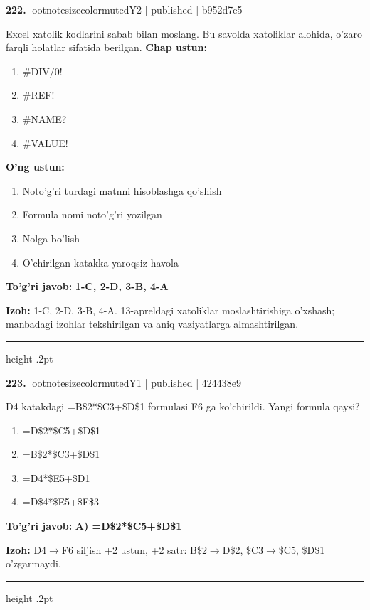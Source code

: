 \documentclass[10pt,a4paper]{article}
\begin{document}
\textbf{\color{ink}222.} {ootnotesizecolor{muted}Y2 | published | b952d7e5}
\par
Excel xatolik kodlarini sabab bilan moslang. Bu savolda xatoliklar alohida, o'zaro farqli holatlar sifatida berilgan.
\textbf{Chap ustun:}\begin{enumerate}[label=\arabic*),leftmargin=9mm]
\item \#DIV/0!
\item \#REF!
\item \#NAME?
\item \#VALUE!
\end{enumerate}
\textbf{O'ng ustun:}\begin{enumerate}[label=\Alph*),leftmargin=9mm]
\item Noto'g'ri turdagi matnni hisoblashga qo'shish
\item Formula nomi noto'g'ri yozilgan
\item Nolga bo'lish
\item O'chirilgan katakka yaroqsiz havola
\end{enumerate}
\begin{tcolorbox}[enhanced,breakable,colback=teal!4,colframe=teal!55!black,boxrule=0.45pt,arc=1.2mm,left=2.8mm,right=2.8mm,top=2mm,bottom=2mm]
\textbf{\color{teal}To'g'ri javob:} \textbf{1-C, 2-D, 3-B, 4-A}
\par\smallskip
\textbf{Izoh:} 1-C, 2-D, 3-B, 4-A. 13-apreldagi xatoliklar moslashtirishiga o'xshash; manbadagi izohlar tekshirilgan va aniq vaziyatlarga almashtirilgan.
\end{tcolorbox}
\vspace{2mm}\hrule height .2pt\vspace{2mm}

\textbf{\color{ink}223.} {ootnotesizecolor{muted}Y1 | published | 424438e9}
\par
D4 katakdagi =B\$2*\$C3+\$D\$1 formulasi F6 ga ko'chirildi. Yangi formula qaysi?
\begin{enumerate}[label=\Alph*),leftmargin=9mm]
\item =D\$2*\$C5+\$D\$1
\item =B\$2*\$C3+\$D\$1
\item =D4*\$E5+\$D1
\item =D\$4*\$E5+\$F\$3
\end{enumerate}
\begin{tcolorbox}[enhanced,breakable,colback=teal!4,colframe=teal!55!black,boxrule=0.45pt,arc=1.2mm,left=2.8mm,right=2.8mm,top=2mm,bottom=2mm]
\textbf{\color{teal}To'g'ri javob:} \textbf{A) =D\$2*\$C5+\$D\$1}
\par\smallskip
\textbf{Izoh:} D4\ensuremath{\rightarrow}F6 siljish +2 ustun, +2 satr: B\$2\ensuremath{\rightarrow}D\$2, \$C3\ensuremath{\rightarrow}\$C5, \$D\$1 o'zgarmaydi.
\end{tcolorbox}
\vspace{2mm}\hrule height .2pt\vspace{2mm}
\end{document}
